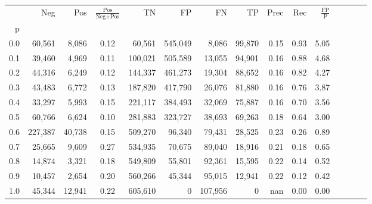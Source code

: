 \begin{tabular}{rrrcrrrrrrrrrrr}
\toprule
{} &      Neg &     Pos & $\frac{\text{Pos}}{\text{Neg}+\text{Pos}}$ &       TN &       FP &       FN &      TP &  Prec &   Rec & $\frac{\text{FP}}{\text{P}}$ \\
p   &          &         &                                            &          &          &          &         &       &       &                              \\
\midrule
0.0 &   60,561 &   8,086 &                                       0.12 &   60,561 &  545,049 &    8,086 &  99,870 &  0.15 &  0.93 &                         5.05 \\
0.1 &   39,460 &   4,969 &                                       0.11 &  100,021 &  505,589 &   13,055 &  94,901 &  0.16 &  0.88 &                         4.68 \\
0.2 &   44,316 &   6,249 &                                       0.12 &  144,337 &  461,273 &   19,304 &  88,652 &  0.16 &  0.82 &                         4.27 \\
0.3 &   43,483 &   6,772 &                                       0.13 &  187,820 &  417,790 &   26,076 &  81,880 &  0.16 &  0.76 &                         3.87 \\
0.4 &   33,297 &   5,993 &                                       0.15 &  221,117 &  384,493 &   32,069 &  75,887 &  0.16 &  0.70 &                         3.56 \\
0.5 &   60,766 &   6,624 &                                       0.10 &  281,883 &  323,727 &   38,693 &  69,263 &  0.18 &  0.64 &                         3.00 \\
0.6 &  227,387 &  40,738 &                                       0.15 &  509,270 &   96,340 &   79,431 &  28,525 &  0.23 &  0.26 &                         0.89 \\
0.7 &   25,665 &   9,609 &                                       0.27 &  534,935 &   70,675 &   89,040 &  18,916 &  0.21 &  0.18 &                         0.65 \\
0.8 &   14,874 &   3,321 &                                       0.18 &  549,809 &   55,801 &   92,361 &  15,595 &  0.22 &  0.14 &                         0.52 \\
0.9 &   10,457 &   2,654 &                                       0.20 &  560,266 &   45,344 &   95,015 &  12,941 &  0.22 &  0.12 &                         0.42 \\
1.0 &   45,344 &  12,941 &                                       0.22 &  605,610 &        0 &  107,956 &       0 &   nan &  0.00 &                         0.00 \\
\bottomrule
\end{tabular}
